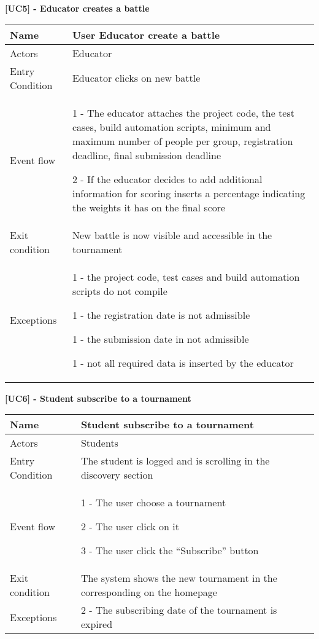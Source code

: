     \begin{table}[]
    \textbf{[UC5] - Educator creates a battle}
    
      \centering
      \begin{tabular}{|p{3cm}|p{14cm}|}
        \hline
         Name & User Educator create a battle \\
        \hline
        Actors & Educator \\
        \hline
        Entry Condition & Educator clicks on new battle \\
        \hline
        Event flow &  1 - The educator attaches the project code, the test cases, build automation scripts, minimum and maximum number of people per group, registration deadline, final submission deadline  
        
        2 - If the educator decides to add additional information for scoring inserts a percentage indicating the weights it has on the final score
        \\
        \hline
        Exit condition & New battle is now visible and accessible in the tournament \\
        \hline
        Exceptions & 1 - the project code, test cases and build automation scripts do not compile
        
        1 - the registration date is not admissible
        
        1 - the submission date in not admissible
        
        1 - not all required data is inserted by the educator
        \\
        \hline
      \end{tabular}
      
    \end{table}

    \begin{table}[h]
    
      \textbf{[UC6] - Student subscribe to a tournament}
      
      \centering
      \begin{tabular}{|p{3cm}|p{14cm}|}
        \hline
        Name & Student subscribe to a tournament \\
        \hline
        Actors & Students \\
        \hline
        Entry Condition & The student is logged and is scrolling in the discovery section \\
        \hline
        Event flow &  1 - The user choose a tournament
        
        2 - The user click on it

        3 - The user click the ``Subscribe'' button
        \\
        \hline
        Exit condition & The system shows the new tournament in the corresponding on the homepage \\
        \hline
        Exceptions & 2 - The subscribing date of the tournament is expired  
        \\
        \hline

        
      \end{tabular}

      
    \end{table}

